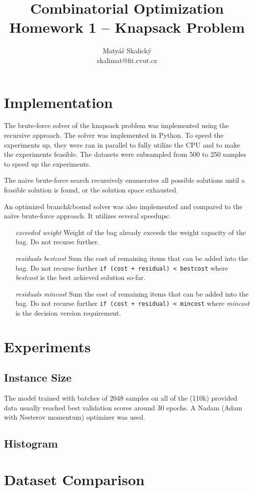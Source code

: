 \documentclass[a4paper,10pt]{article}
\title{Combinatorial Optimization\\Homework 1 – Knapsack Problem}
\author{Matyáš Skalický\\skalimat@fit.cvut.cz}
\begin{document}
\maketitle
\tableofcontents
\medskip


\section{Implementation}
The brute-force solver of the knapsack problem was implemented using the recursive approach. The solver was implemented in Python. To speed the experiments up, they were ran in parallel to fully utilize the CPU and to make the experiments feasible. The datasets were subsampled from 500 to 250 samples to speed up the experiments.

The naive brute-force search recursively enumerates all possible solutions until a feasible solution is found, or the solution space exhausted.

An optimized branch\&bound solver was also implemented and compared to the naïve brute-force approach. It utilizes several speedups:

\begin{enumerate}[leftmargin=1in]
	\item[\emph{exceeded weight}] Weight of the bag already exceeds the weight capacity of the bag. Do not recurse further.
	\item[\emph{residuals bestcost}] Sum the cost of remaining items that can be added into the bag. Do not recurse further \lstinline{if (cost + residual) < bestcost} where \emph{bestcost} is the best achieved solution so-far.
	\item[\emph{residuals mincost}] Sum the cost of remaining items that can be added into the bag. Do not recurse further \lstinline{if (cost + residual) < mincost} where \emph{mincost} is the decision version requirement.
\end{enumerate}


\section{Experiments}
\subsection{Instance Size}
The model trained with batches of 2048 samples on all of the (110k) provided data usually reached best validation scores around 30 epochs. A Nadam (Adam with Nesterov momentum) optimizer was used. 

\subsection{Histogram}

\section{Dataset Comparison}


\end{document}
